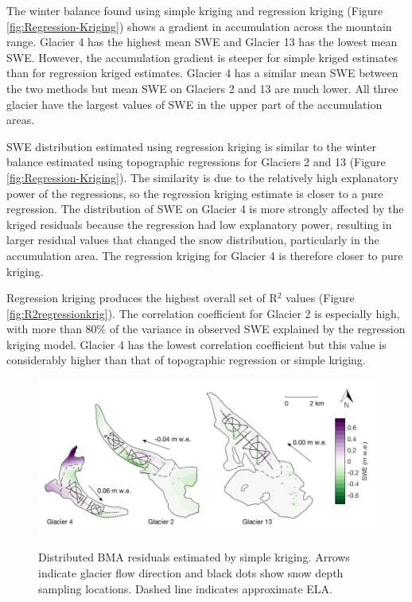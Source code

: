 \documentclass[12pt]{article}
\newcommand{\topomap}{Arrows indicate glacier flow direction and black dots show snow depth sampling locations. }
\begin{document}
The winter balance found using simple kriging and regression kriging (Figure \ref{fig:Regression-Kriging}) shows a gradient in accumulation across the mountain range. Glacier 4 has the highest mean SWE and Glacier 13 has the lowest mean SWE. However, the accumulation gradient is steeper for simple kriged estimates than for regression kriged estimates. Glacier 4 has a similar mean SWE between the two methods but mean SWE on Glaciers 2 and 13 are much lower. All three glacier have the largest values of SWE in the upper part of the accumulation areas. 

SWE distribution estimated using regression kriging is similar to the winter balance estimated using topographic regressions for Glaciers 2 and 13 (Figure \ref{fig:Regression-Kriging}). The similarity is due to the relatively high explanatory power of the regressions, so the regression kriging estimate is closer to a pure regression. The distribution of SWE on Glacier 4 is more strongly affected by the kriged residuals because the regression had low explanatory power, resulting in larger residual values that changed the snow distribution, particularly in the accumulation area. The regression kriging for Glacier 4 is therefore closer to pure kriging.

Regression kriging produces the highest overall set of R$^2$ values (Figure \ref{fig:R2regressionkrig}). The correlation coefficient for Glacier 2 is especially high, with more than 80\% of the variance in observed SWE explained by the regression kriging model. Glacier 4 has the lowest correlation coefficient but this value is considerably higher than that of topographic regression or simple kriging. 

\begin{figure}[H]
	\centering
	\includegraphics[width = \textwidth]{residualsKriged.png}\\
	\caption{Distributed BMA residuals estimated by simple kriging.  \topomap Dashed line indicates approximate ELA.}
	\label{fig:residualsKRIGING}
\end{figure}
\end{document}
